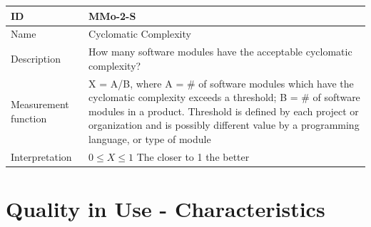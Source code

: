 \begin{table}[h!]
  \renewcommand{\arraystretch}{1.4}
  \centering
  \begin{tabularx}{\textwidth}{l X}
    \toprule
    \textbf{ID}          & \textbf{MMo-2-S}                                                                                                                                                                                                                                                               \\
    \midrule
    Name                 & Cyclomatic Complexity                                                                                                                                                                                                                                                          \\
    Description          & How many software modules have the acceptable cyclomatic complexity?                                                                                                                                                                                                           \\
    Measurement function & X = A/B, where A = \#  of software modules which have the cyclomatic complexity exceeds a threshold; B = \# of software modules in a product. Threshold is defined by each project or organization and is possibly diﬀerent value by a programming language, or type of module \\
    Interpretation       & $0 \leq X \leq 1$ The closer to 1 the better                                                                                                                                                                                                                                   \\
    \bottomrule
  \end{tabularx}
\end{table}

\section{Quality in Use - Characteristics}

